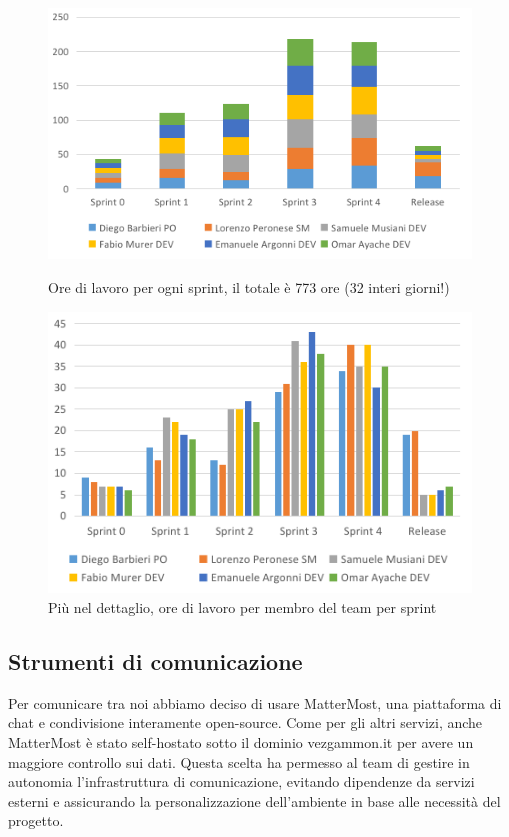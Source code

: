 \documentclass{article}
\begin{document}
\begin{figure}[H]
    \centering
    \begin{minipage}[t]{0.52\textwidth}
        \centering
        \includegraphics[width=\textwidth]{report-logging_sprints}
        \caption{Ore di lavoro per ogni sprint, il totale è 773 ore (32 interi giorni!)}
        \label{fig:logging-sprints}
    \end{minipage}
    \hfill
    \begin{minipage}[t]{0.47\textwidth}
        \centering
        \includegraphics[width=\textwidth]{report-logging_full}
        \caption{Più nel dettaglio, ore di lavoro per membro del team per sprint}
        \label{fig:logging-full}
    \end{minipage}    
\end{figure}



\subsection{Strumenti di comunicazione} \label{sec:mm}
Per comunicare tra noi abbiamo deciso di usare MatterMost, una piattaforma di chat e condivisione interamente open-source. Come per gli altri 
servizi, anche MatterMost è stato self-hostato sotto il dominio vezgammon.it per avere un maggiore controllo sui dati. Questa scelta ha permesso 
al team di gestire in autonomia l'infrastruttura di comunicazione, evitando dipendenze da servizi esterni e assicurando la personalizzazione 
dell'ambiente in base alle necessità del progetto.
\end{document}
